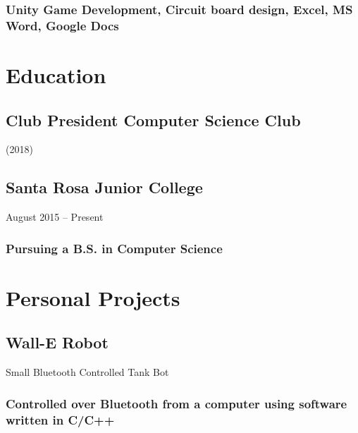 \documentclass{article}
\begin{document}
		\subsubsection{ Unity Game Development, Circuit board design, Excel, MS Word, Google Docs}
		\vspace{-3mm}
    		
    		    		
	\section{Education}
        \subsection{Club President  Computer Science Club}  (2018)
        \vspace{-2mm}   
         
        \subsection{Santa Rosa Junior College} August 2015 – Present 
        \vspace{-2mm}
            \subsubsection{Pursuing a B.S. in Computer Science}
\section{Personal Projects}

	\subsection{Wall-E Robot}Small Bluetooth Controlled Tank Bot
    	\vspace{-3mm}
		\subsubsection{Controlled over Bluetooth from a computer using software written in C/C++}
		
		
\end{document}
